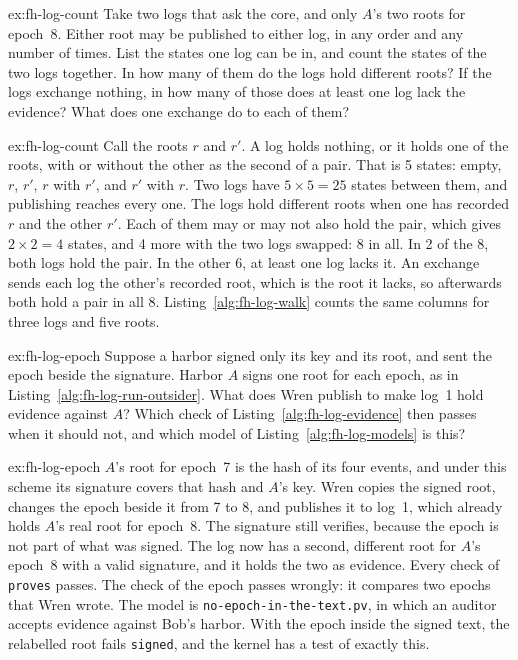 \documentclass[11pt,a4paper]{article}
\theoremstyle{definition}
\theoremstyle{remark}
\begin{document}
\begin{pdexercise}[kind=Trace,rating=2]{ex:fh-log-count}
Take two logs that ask the core, and only $A$'s two roots for epoch~8.
Either root may be published to either log, in any order and any number
of times. List the states one log can be in, and count the states of the
two logs together. In how many of them do the logs hold different roots?
If the logs exchange nothing, in how many of those does at least one log
lack the evidence? What does one exchange do to each of them?
\end{pdexercise}
\begin{pdsolution}{ex:fh-log-count}
Call the roots $r$ and $r'$. A log holds nothing, or it holds one of the
roots, with or without the other as the second of a pair. That is 5
states: empty, $r$, $r'$, $r$ with $r'$, and $r'$ with $r$. Two logs have $5\times 5=25$
states between them, and publishing reaches every one. The logs hold
different roots when one has recorded $r$ and the other $r'$. Each of
them may or may not also hold the pair, which gives $2\times 2=4$ states,
and 4 more with the two logs swapped: 8 in all. In 2 of the 8, both logs
hold the pair. In the other 6, at least one log lacks it. An exchange
sends each log the other's recorded root, which is the root it lacks, so
afterwards both hold a pair in all 8. Listing~\ref{alg:fh-log-walk}
counts the same columns for three logs and five roots.
\end{pdsolution}

\begin{pdexercise}[kind=Trace,rating=2]{ex:fh-log-epoch}
Suppose a harbor signed only its key and its root, and sent the epoch
beside the signature. Harbor $A$ signs one root for each epoch, as in
Listing~\ref{alg:fh-log-run-outsider}. What does Wren publish to make
log~1 hold evidence against $A$? Which check of
Listing~\ref{alg:fh-log-evidence} then passes when it should not, and
which model of Listing~\ref{alg:fh-log-models} is this?
\end{pdexercise}
\begin{pdsolution}{ex:fh-log-epoch}
$A$'s root for epoch~7 is the hash of its four events, and under this
scheme its signature covers that hash and $A$'s key. Wren copies the
signed root, changes the epoch beside it from 7 to 8, and publishes it to
log~1, which already holds $A$'s real root for epoch~8. The signature
still verifies, because the epoch is not part of what was signed. The log
now has a second, different root for $A$'s epoch~8 with a valid
signature, and it holds the two as evidence. Every check of
\texttt{proves} passes. The check of the epoch passes wrongly: it
compares two epochs that Wren wrote. The model is
\texttt{no-epoch-in-the-text.pv}, in which an auditor accepts evidence
against Bob's harbor. With the epoch inside the signed text, the relabelled root
fails \texttt{signed}, and the kernel has a test of exactly this.
\end{pdsolution}
\end{document}
